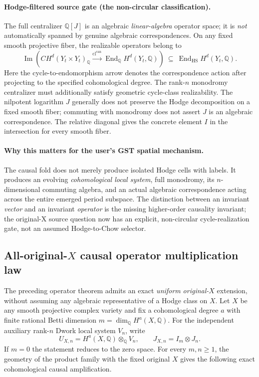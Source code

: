 \documentclass[11pt]{article}
\begin{document}
\paragraph{Hodge-filtered source gate (the non-circular classification).}
The full centralizer $\mathbb Q[J]$ is an algebraic
\emph{linear-algebra} operator space; it is \emph{not}
automatically spanned by genuine algebraic correspondences.
On any fixed smooth projective fiber, the realizable
operators belong to
\[
  \boxed{
  \operatorname{Im}\!\left(
    CH^{d}(Y_t\times Y_t)_{\mathbb Q}
    \xrightarrow{\mathrm{cl}^{\mathrm{can}}}
       \operatorname{End}_{\mathbb Q}H^{d}(Y_t,\mathbb Q)
  \right)
  \ \subseteq\ \operatorname{End}_{\mathrm{HS}}H^{d}(Y_t,\mathbb Q).
  }\tag{C3}
\]
Here the cycle-to-endomorphism arrow denotes the
correspondence action after projecting to the specified
cohomological degree.  The rank-$n$ monodromy centralizer
must additionally satisfy geometric cycle-class
realizability.  The nilpotent logarithm $J$ generally
does not preserve the Hodge decomposition on a
fixed smooth fiber; commuting with monodromy does
not assert $J$ is an algebraic correspondence.
The relative diagonal gives the concrete element
$I$ in the intersection for every smooth fiber.

\paragraph{Why this matters for the user's GST spatial mechanism.}
The causal fold does not merely produce isolated
Hodge cells with labels. It produces an evolving
\emph{cohomological local system}, full monodromy,
its $n$-dimensional commuting algebra, and an
actual algebraic correspondence acting across
the entire emerged period subspace. The distinction
between an invariant \emph{vector} and an invariant
\emph{operator} is the missing higher-order
causality invariant; the original-X source
question now has an explicit, non-circular
cycle-realization gate, not an assumed
Hodge-to-Chow selector.


\subsection{All-original-$X$ causal operator multiplication law}

The preceding operator theorem admits an exact \emph{uniform
original-$X$} extension, without assuming any algebraic
representative of a Hodge class on $X$.
Let $X$ be any smooth projective complex variety and
fix a cohomological degree $a$ with finite rational Betti
dimension
$m=\dim_{\mathbb Q}H^a(X,\mathbb Q)$.
For the independent auxiliary rank-$n$ Dwork
local system $V_n$, write
\[
U_{X,n} = H^a(X,\mathbb Q)\otimes_{\mathbb Q}V_n,\qquad
J_{X,n} = I_m\otimes J_n.
\]
If $m=0$ the statement reduces to the zero space.
For every $m,n\ge 1$, the geometry of the product
family with the fixed original $X$ gives the following exact
cohomological causal amplification.
\end{document}
